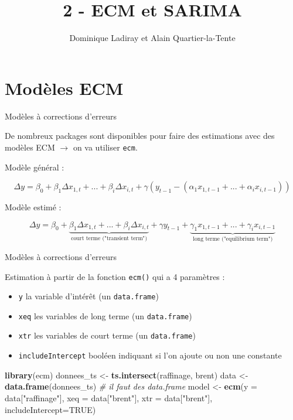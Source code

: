 \documentclass[10pt,xcolor=table,color={dvipsnames,usenames},ignorenonframetext,usepdftitle=false,french]{beamer}
\title{2 - ECM et SARIMA}
\author{Dominique Ladiray et Alain Quartier-la-Tente}
\date{}
\newenvironment{Shaded}{\begin{snugshade}}{\end{snugshade}}
\newcommand{\CommentTok}[1]{\textcolor[rgb]{0.56,0.35,0.01}{\textit{#1}}}
\newcommand{\DataTypeTok}[1]{\textcolor[rgb]{0.13,0.29,0.53}{#1}}
\newcommand{\KeywordTok}[1]{\textcolor[rgb]{0.13,0.29,0.53}{\textbf{#1}}}
\newcommand{\NormalTok}[1]{#1}
\newcommand{\OtherTok}[1]{\textcolor[rgb]{0.56,0.35,0.01}{#1}}
\newcommand{\StringTok}[1]{\textcolor[rgb]{0.31,0.60,0.02}{#1}}
\begin{document}

\hypertarget{moduxe8les-ecm}{%
\section{Modèles ECM}\label{moduxe8les-ecm}}

\begin{frame}[fragile]{Modèles à corrections d'erreurs}
\protect\hypertarget{moduxe8les-uxe0-corrections-derreurs}{}

De nombreux packages sont disponibles pour faire des estimations avec
des modèles ECM \(\rightarrow\) on va utiliser \texttt{ecm}.

Modèle général :

\[
\Delta y = \beta_{0} + \beta_{1}\Delta x_{1,t} +...+ \beta_{i}\Delta x_{i,t} + \gamma(y_{t-1} - (\alpha_{1}x_{1,t-1} +...+\alpha_{i}x_{i,t-1}))
\]

Modèle estimé :

\[
\Delta y = \beta_{0} + \underbrace{\beta_{1}\Delta x_{1,t} +...+ \beta_{i}\Delta x_{i,t}}_{\text{court terme ("transient term")}} + \gamma y_{t-1} + \underbrace{\gamma_1 x_{1,t-1} +...+ \gamma_i x_{i,t-1}}_{\text{long terme ("equilibrium term")}}
\]

\end{frame}

\begin{frame}[fragile]{Modèles à corrections d'erreurs}
\protect\hypertarget{moduxe8les-uxe0-corrections-derreurs-1}{}

Estimation à partir de la fonction \texttt{ecm()} qui a 4 paramètres :

\begin{itemize}
\item
  \texttt{y} la variable d'intérêt (un \texttt{data.frame})
\item
  \texttt{xeq} les variables de long terme (un \texttt{data.frame})
\item
  \texttt{xtr} les variables de court terme (un \texttt{data.frame})
\item
  \texttt{includeIntercept} booléen indiquant si l'on ajoute ou non une
  constante
\end{itemize}

\begin{Shaded}
\begin{Highlighting}[]
\KeywordTok{library}\NormalTok{(ecm)}
\NormalTok{donnees_ts <-}\StringTok{ }\KeywordTok{ts.intersect}\NormalTok{(raffinage, brent)}
\NormalTok{data <-}\StringTok{ }\KeywordTok{data.frame}\NormalTok{(donnees_ts) }\CommentTok{# il faut des data.frame}
\NormalTok{model <-}\StringTok{ }\KeywordTok{ecm}\NormalTok{(}\DataTypeTok{y =}\NormalTok{ data[}\StringTok{"raffinage"}\NormalTok{], }
             \DataTypeTok{xeq =}\NormalTok{ data[}\StringTok{"brent"}\NormalTok{],}
             \DataTypeTok{xtr =}\NormalTok{ data[}\StringTok{"brent"}\NormalTok{],}
             \DataTypeTok{includeIntercept=}\OtherTok{TRUE}\NormalTok{)}
\end{Highlighting}
\end{Shaded}

\end{frame}
\end{document}
